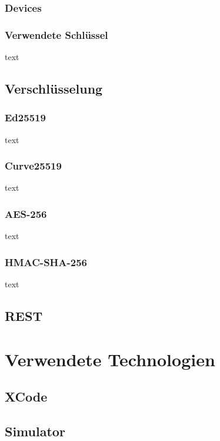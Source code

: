     \subsection{Devices}


    \subsection{Verwendete Schlüssel}\label{subsec:verwendete-schlussel}
    text


    \section{Verschlüsselung}\label{sec:verschlusselung}

    \subsection{Ed25519}\label{subsec:ed25519}
    text

    \subsection{Curve25519}\label{subsec:curve25519}
    text

    \subsection{AES-256}\label{subsec:aes-256}
    text

    \subsection{HMAC-SHA-256}\label{subsec:hmac-sha-256}
    text

    \section{REST}\label{sec:rest}


    \chapter{Verwendete Technologien}\label{ch:verwendete-technologien}


    \section{XCode}\label{sec:xcode}


    \section{Simulator}\label{sec:simulator}


